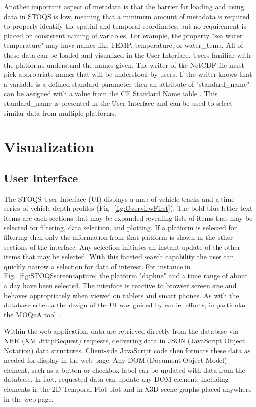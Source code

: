 \documentclass[conference]{IEEEtran}
\begin{document}
Another important aspect of metadata is that the barrier for loading and using data in 
STOQS is low, meaning that a minimum amount of metadata is required to properly 
identify the spatial and temporal coordinates, but no requirement is placed on 
consistent naming of variables. For example, the property "sea water temperature" may 
have names like TEMP, temperature, or water\_temp. All of these data can be loaded and 
visualized in the User Interface. Users familiar with the platforms understand the names 
given. The writer of the NetCDF file must pick appropriate names that will be understood 
by users. If the writer knows that a variable is a defined standard parameter then an 
attribute of "standard\_name" can be assigned with a value from the CF Standard Name 
table \cite{CFSN}. This standard\_name is presented in the User Interface and can be 
used to select similar data from multiple platforms.

\section{Visualization}

\subsection{User Interface}

The STOQS User Interface (UI) displays a map of vehicle tracks and a time series of 
vehicle depth profiles (Fig.~\ref{fig:OverviewFirst}). The bold blue letter text items are each sections that may be expanded revealing lists of items that may be selected for filtering, data selection, and plotting. If a platform is selected for filtering then only the information from that platform is shown in the other sections of the interface. Any selection initiates an instant update of the other items that may be selected. With this faceted search capability the user can quickly narrow a selection for data of interest. For instance in Fig.~\ref{fig:STOQSscreencapture} the platform "daphne"  and a time range of about a day have been selected. The interface is reactive to browser screen size and behaves appropriately when viewed on tablets and smart phones. As with the database schema the design of the UI was guided by earlier efforts, in particular the MOQuA tool \cite{godin05}.

Within the web application, data are retrieved directly from the database via XHR (XMLHttpRequest) requests, delivering data in JSON (JavaScript Object Notation) data structures. Client-side JavaScript code then formats these data as needed for display in the web page. Any DOM (Document Object Model) element, such as a button or checkbox label can be updated with data from the database. In fact, requested data can update any DOM element, including elements in the 2D Temporal Flot plot and in X3D scene graphs placed anywhere in the web page.
\end{document}

